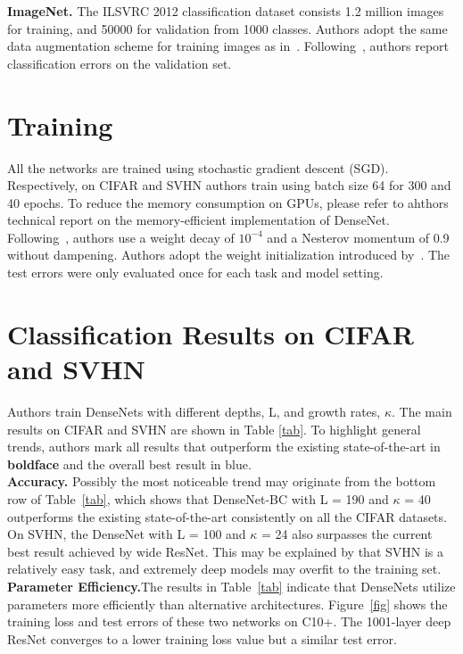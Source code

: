 \documentclass[10pt,letterpaper]{article}
\begin{document}
\begin{multicols}{2}
{\bf ImageNet.} The ILSVRC 2012 classification dataset consists 1.2 million images for training, and 50000 for validation from 1000 classes. Authors adopt the same data augmentation scheme for training images as in~\cite{Deep,Identity}. Following~\cite{Deep,Depth}, authors report classification errors on the validation set. \\
\section{Training} All the networks are trained using stochastic gradient descent (SGD). Respectively, on CIFAR and SVHN authors train using batch size 64 for 300 and 40 epochs. To reduce the memory consumption on GPUs, please refer to ahthors technical report on the memory-efficient implementation of DenseNet. \\
Following~\cite{Network}, authors use a weight decay of $10^{-4}$ and a Nesterov momentum of 0.9 without dampening. Authors adopt the weight initialization introduced by~\cite{Identity}. The test errors were only evaluated once for each task and model setting.\\
\section{Classification Results on CIFAR and SVHN}
Authors train DenseNets with different depths, L, and growth rates, $\kappa$. The main results on CIFAR and SVHN are shown in Table \ref{tab}. To highlight general trends, authors mark all results that outperform the existing state-of-the-art in {\bf boldface} and the overall best result in {\color{blue} blue}.\\
{\bf Accuracy.} Possibly the most noticeable trend may originate from the bottom row of Table~\ref{tab}, which shows that DenseNet-BC with L = 190 and $\kappa$ = 40 outperforms the existing state-of-the-art consistently on all the CIFAR datasets. On SVHN, the DenseNet with L = 100 and $\kappa$ = 24 also surpasses the current best result achieved by wide ResNet. This may be explained by that SVHN is a relatively easy task, and extremely deep models may overfit to the training set.\\
{\bf Parameter Efficiency.}The results in Table~\ref{tab} indicate that DenseNets utilize parameters more efficiently than alternative architectures. Figure~\ref{fig} shows the training loss and test errors of these two networks on C10+. The 1001-layer deep ResNet converges to a lower training loss value but a similar test error. \\
\end{multicols}
\end{document}
